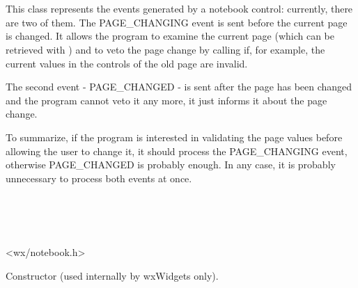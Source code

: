 \section{}\label{wxnotebookevent}

This class represents the events generated by a notebook control: currently,
there are two of them. The PAGE\_CHANGING event is sent before the current
page is changed. It allows the program to examine the current page (which
can be retrieved with 
) and to veto the page
change by calling  if, for example, the
current values in the controls of the old page are invalid.

The second event - PAGE\_CHANGED - is sent after the page has been changed and
the program cannot veto it any more, it just informs it about the page change.

To summarize, if the program is interested in validating the page values
before allowing the user to change it, it should process the PAGE\_CHANGING
event, otherwise PAGE\_CHANGED is probably enough. In any case, it is probably
unnecessary to process both events at once.


\\
\\
\\


<wx/notebook.h>









\label{wxnotebookeventconstr}


Constructor (used internally by wxWidgets only).


\label{wxnotebookeventgetoldselection}


